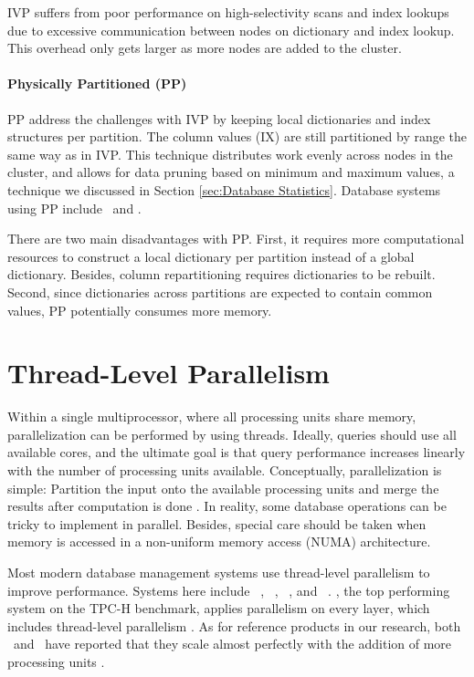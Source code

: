 IVP suffers from poor performance on high-selectivity scans and index lookups due to excessive communication between nodes on dictionary and index lookup. This overhead only gets larger as more nodes are added to the cluster.

\paragraph{Physically Partitioned (PP)}
\label{par:Physically Partitioned (PP)}
PP address the challenges with IVP by keeping local dictionaries and index structures per partition. The column values (IX) are still partitioned by range the same way as in IVP. This technique distributes work evenly across nodes in the cluster, and allows for data pruning based on minimum and maximum values, a technique we discussed in Section \ref{sec:Database Statistics}. Database systems using PP include \oracle~and \saph.

There are two main disadvantages with PP. First, it requires more computational resources to construct a local dictionary per partition instead of a global dictionary. Besides, column repartitioning requires dictionaries to be rebuilt. Second, since dictionaries across partitions are expected to contain common values, PP potentially consumes more memory.

\section{Thread-Level Parallelism}
\label{sec:Thread-lever Parallelism}
Within a single multiprocessor, where all processing units share memory, parallelization can be performed by using threads. Ideally, queries should use all available cores, and the ultimate goal is that query performance increases linearly with the number of processing units available. Conceptually, parallelization is simple: Partition the input onto the available processing units and merge the results after computation is done \cite{Neumann2011-uq}. In reality, some database operations can be tricky to implement in parallel. Besides, special care should be taken when memory is accessed in a non-uniform memory access (NUMA) architecture. 

Most modern database management systems use thread-level parallelism to improve performance. Systems here include \vertica~\cite{Lamb2012-kg}, \mssql~\cite{Larson2013-mc}, \blink~\cite{Barber2012-xt, Johnson2008-cp}, and \saph~\cite{Farber2012-vh}. \exasol, the top performing system on the TPC-H benchmark, applies parallelism on every layer, which includes thread-level parallelism \cite{Exasol2014-xh}. As for reference products in our research, both \qlikview~and \tableau~have reported that they scale almost perfectly with the addition of more processing units \cite{Kamkolkar2015-iq, Qlik2011-ef}. 

